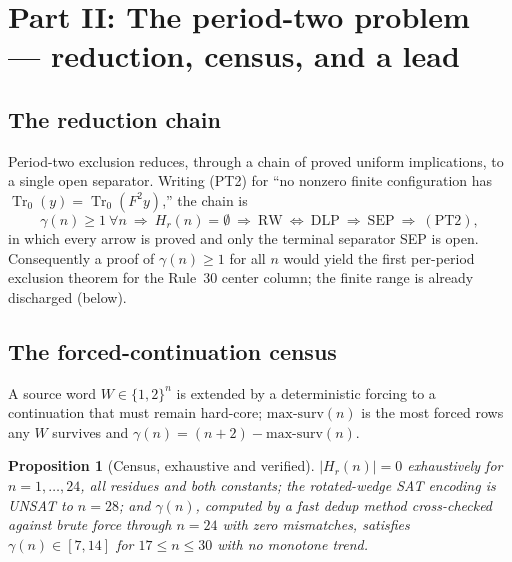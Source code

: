 \documentclass[11pt]{article}
\newtheorem{proposition}[theorem]{Proposition}
\theoremstyle{definition}
\newcommand{\Tr}{\operatorname{Tr}}
\newcommand{\gm}{\gamma}
\begin{document}
\section{Part II: The period-two problem --- reduction, census, and a lead}
\label{sec:periodtwo}

\subsection{The reduction chain}

Period-two exclusion reduces, through a chain of proved uniform implications, to
a single open separator. Writing (PT2) for ``no nonzero finite configuration has
$\Tr_0(y)=\Tr_0(F^2 y)$,'' the chain is
\begin{equation}\label{eq:chain}
 \gm(n)\ge1\ \forall n\ \Rightarrow\ H_r(n)=\emptyset\ \Rightarrow\
 \mathrm{RW}\ \Leftrightarrow\ \mathrm{DLP}\ \Rightarrow\ \mathrm{SEP}\
 \Rightarrow\ \mathrm{(PT2)},
\end{equation}
in which every arrow is proved and only the terminal separator SEP is open.
Consequently a proof of $\gm(n)\ge1$ for all $n$ would yield the first
per-period exclusion theorem for the Rule~30 center column; the finite range is
already discharged (below).

\subsection{The forced-continuation census}

A source word $W\in\{1,2\}^n$ is extended by a deterministic forcing to a
continuation that must remain hard-core; $\mathrm{max\text{-}surv}(n)$ is the
most forced rows any $W$ survives and $\gm(n)=(n+2)-\mathrm{max\text{-}surv}(n)$.

\begin{proposition}[Census, exhaustive and verified]\label{prop:census}
$|H_r(n)|=0$ exhaustively for $n=1,\dots,24$, all residues and both constants;
the rotated-wedge SAT encoding is UNSAT to $n=28$; and $\gm(n)$, computed by a
fast dedup method cross-checked against brute force through $n=24$ with zero
mismatches, satisfies $\gm(n)\in[7,14]$ for $17\le n\le30$ with no monotone
trend.
\end{proposition}
\end{document}
